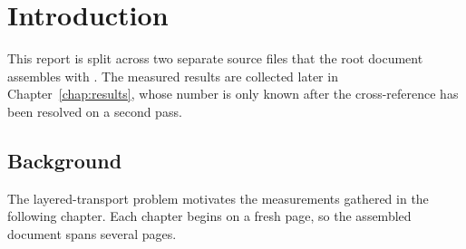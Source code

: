 \chapter{Introduction}

This report is split across two separate source files that the root document
assembles with \verb||. The measured results are collected later in
Chapter~\ref{chap:results}, whose number is only known after the cross-reference
has been resolved on a second pass.

\section{Background}

The layered-transport problem motivates the measurements gathered in the
following chapter. Each chapter begins on a fresh page, so the assembled
document spans several pages.
